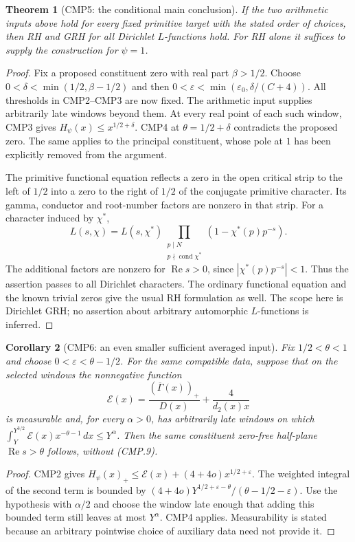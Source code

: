 \documentclass[11pt,a4paper]{article}
\numberwithin{equation}{section}
\newtheorem{theorem}{Theorem}[section]
\newtheorem{corollary}[theorem]{Corollary}
\theoremstyle{remark}\newtheorem{remark}[theorem]{Remark}
\begin{document}
\begin{theorem}[CMP5: the conditional main conclusion]
\label{claim:CMP5}
If the two arithmetic inputs above hold for every fixed primitive
target with the stated order of choices, then RH and GRH for all
Dirichlet $L$-functions hold.  For RH alone it suffices to supply
the construction for $\psi=1$.
\end{theorem}
\begin{proof}
Fix a proposed constituent zero with real part $\beta>1/2$.
Choose $0<\delta<\min(1/2,\beta-1/2)$ and then
$0<\varepsilon<\min(\varepsilon_0,\delta/(C+4))$.
All thresholds in CMP2--CMP3 are now fixed.  The arithmetic input
supplies arbitrarily late windows beyond them.  At every real
point of each such window, CMP3 gives
$H_\psi(x)\le x^{1/2+\delta}$.
CMP4 at $\theta=1/2+\delta$ contradicts the proposed zero.
The same applies to the principal constituent, whose pole at $1$
has been explicitly removed from the argument.

The primitive functional equation reflects a zero in the open
critical strip to the left of $1/2$ into a zero to the right of
$1/2$ of the conjugate primitive character.  Its gamma, conductor
and root-number factors are nonzero in that strip.  For a character
induced by $\chi^*$,
\[
 L(s,\chi)=L(s,\chi^*)
       \prod_{\substack{p\mid N\\p\nmid\operatorname{cond}\chi^*}}
                                      (1-\chi^*(p)p^{-s}).
\]
The additional factors are nonzero for $\operatorname{Re}s>0$,
since $|\chi^*(p)p^{-s}|<1$.  Thus the assertion passes to all
Dirichlet characters.  The ordinary functional equation and the
known trivial zeros give the usual RH formulation as well.
The scope here is Dirichlet GRH; no assertion about arbitrary
automorphic $L$-functions is inferred.
\end{proof}

\begin{corollary}[CMP6: an even smaller sufficient averaged input]
\label{claim:CMP6}
Fix $1/2<\theta<1$ and choose $0<\varepsilon<\theta-1/2$.
For the same compatible data, suppose that on the selected windows
the nonnegative function
\[
 \mathcal E(x)=\frac{(\overline\Gamma(x))_+}{D(x)}
                                      +\frac4{d_2(x)x}
 \tag{CMP.19}
\]
is measurable and, for every $\alpha>0$, has arbitrarily late
windows on which
$\int_Y^{Y^{3/2}}\mathcal E(x)x^{-\theta-1}\,\allowbreak{} dx\le Y^\alpha$.
Then the same constituent zero-free half-plane
$\operatorname{Re}s>\theta$ follows, without (CMP.9).
\end{corollary}
\begin{proof}
CMP2 gives
$H_\psi(x)_+\le\mathcal E(x)+(4+4o)x^{1/2+\varepsilon}$.
The weighted integral of the second term is bounded by
$(4+4o)Y^{1/2+\varepsilon-\theta}/
             (\theta-1/2-\varepsilon)$.
Use the hypothesis with $\alpha/2$ and choose the window late
enough that adding this bounded term still leaves at most
$Y^\alpha$.  CMP4 applies.  Measurability is stated because an
arbitrary pointwise choice of auxiliary data need not provide it.
\end{proof}
\end{document}
